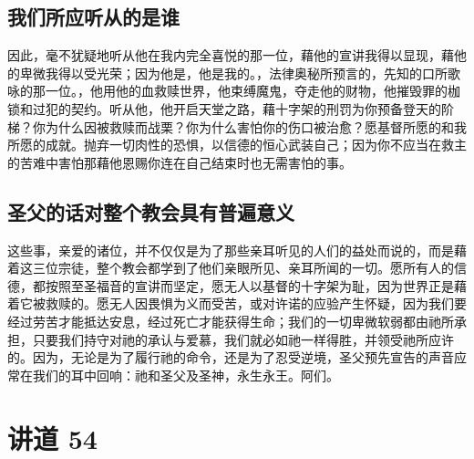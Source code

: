 \subsection{我们所应听从的是谁}

因此，毫不犹疑地听从他在我内完全喜悦的那一位，藉他的宣讲我得以显现，藉他的卑微我得以受光荣；因为他是，他是我的。，法律奥秘所预言的，先知的口所歌咏的那一位。，他用他的血救赎世界，他束缚魔鬼，夺走他的财物，他摧毁罪的枷锁和过犯的契约。听从他，他开启天堂之路，藉十字架的刑罚为你预备登天的阶梯？你为什么因被救赎而战栗？你为什么害怕你的伤口被治愈？愿基督所愿的和我所愿的成就。抛弃一切肉性的恐惧，以信德的恒心武装自己；因为你不应当在救主的苦难中害怕那藉他恩赐你连在自己结束时也无需害怕的事。\par


\subsection{圣父的话对整个教会具有普遍意义}

这些事，亲爱的诸位，并不仅仅是为了那些亲耳听见的人们的益处而说的，而是藉着这三位宗徒，整个教会都学到了他们亲眼所见、亲耳所闻的一切。愿所有人的信德，都按照至圣福音的宣讲而坚定，愿无人以基督的十字架为耻，因为世界正是藉着它被救赎的。愿无人因畏惧为义而受苦，或对许诺的应验产生怀疑，因为我们要经过劳苦才能抵达安息，经过死亡才能获得生命；我们的一切卑微软弱都由祂所承担，只要我们持守对祂的承认与爱慕，我们就必如祂一样得胜，并领受祂所应许的。因为，无论是为了履行祂的命令，还是为了忍受逆境，圣父预先宣告的声音应常在我们的耳中回响：祂和圣父及圣神，永生永王。阿们。\par



\section{讲道 54}

